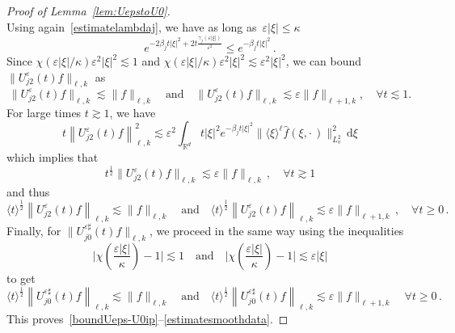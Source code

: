 \documentclass[11pt]{article}
\theoremstyle{definition}
\numberwithin{equation}{section}
\numberwithin{figure}{section}
\numberwithin{table}{section}
\newcommand*{\dd}{\mathrm{d}}
\newcommand*{\dxi}{\dd \xi}
\newcommand*\R {\mathbb{R}}
\newcommand*\eps{{\varepsilon}}
\newcommand*\e{{\varepsilon}}
\let\oldforall\forall
\renewcommand*{\forall}{\mathrel{\oldforall}}
\begin{document}
\begin{proof}[Proof of Lemma~\ref{lem:UepstoU0}]
\[\]
Using again~\eqref{estimatelambdaj}, we have as long as~$\e|\xi|\leq \kappa$
\[
e^{- 2\beta_j t |\xi|^2+ 2t \frac{\gamma_j(\eps|\xi|)}{\eps^2}} \le e^{-\beta_j t |\xi|^2}\,.
\]
Since $\chi(\e|\xi|/\kappa) \eps^2|\xi|^2 \lesssim 1$ and $\chi(\e|\xi|/\kappa) \eps^2|\xi|^2 \lesssim \eps^2|\xi|^2$, we can bound $\|U^\eps_{j2} (t)f\|_{\ell,k}$ as
\[
\|U^\eps_{j2}(t)f\|_{\ell,k} \lesssim \|f\|_{\ell,k} \quad \text{and} \quad \|U^\eps_{j2}(t)f\|_{\ell,k} \lesssim \eps \|f\|_{\ell+1,k},\quad \forall t \lesssim 1.
\]
For large times $t \gtrsim 1$, we have
\[
t \left\|U^\eps_{j2}(t)f\right\|^2_{\ell,k} \lesssim
\eps^2 \int_{\R^d} t|\xi|^2 e^{-\beta_j t|\xi|^2} \big\| \langle \xi \rangle^{\ell}\widehat{f}(\xi,\cdot\,)\big\|^2_{L^2_v} \, \dxi
\]
which implies that
\[
t^\frac12 \|U^\eps_{j2}(t)f\|_{\ell,k}\lesssim \eps \|f\|_{\ell,k} \,, \quad \forall t \gtrsim 1
\]
and thus
\[
\langle t \rangle^{\frac 12} \left\|U^\eps_{j2}(t)f\right\|_{{\ell,k}} \lesssim \|f\|_{\ell,k} \quad \text{and} \quad \langle t \rangle^\frac12 \left\|U^\eps_{j2}(t)f \right\|_{\ell,k} \lesssim \eps \|f\|_{\ell+1,k} \,, \quad \forall t \ge 0 \,.
\]
Finally, for $\|U^{\eps\sharp}_{j0} (t) f\|_{\ell,k}$, we proceed in the same way using the inequalities
\begin{equation}\label{estimatechi}
\Big|\chi\left(\frac{\eps|\xi|}\kappa\right)-1\Big| \lesssim 1 \quad \text{and} \quad \Big|\chi\left(\frac{\eps|\xi|}\kappa\right)-1\Big| \lesssim \eps |\xi|
\end{equation}
to get
\[
\langle t \rangle^{\frac12} \left\| U^{\eps\sharp}_{j0} (t)f \right\|_{{\ell,k}} \lesssim \|f\|_{\ell,k} \quad \text{and} \quad \langle t \rangle^{\frac12} \left\| U^{\eps\sharp}_{j0} (t)f \right\|_{{\ell,k}} \lesssim\eps \|f\|_{\ell+1,k}\quad \forall t \ge 0 \,.
\]
This proves~\eqref{boundUeps-U0ip}--\eqref{estimatesmoothdata}.



\end{proof}
\end{document}

